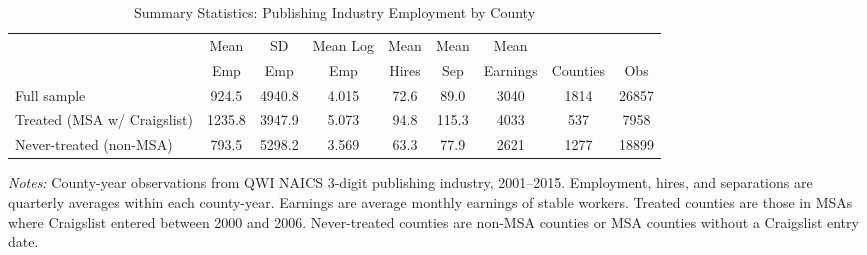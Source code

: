 \begin{table}[htbp]
\centering
\caption{Summary Statistics: Publishing Industry Employment by County}
\label{tab:sumstats}
\begin{adjustbox}{max width=\textwidth}
\begin{threeparttable}
\begin{tabular}{lcccccccc}
\toprule
 & Mean & SD & Mean Log & Mean & Mean & Mean & & \\
 & Emp & Emp & Emp & Hires & Sep & Earnings & Counties & Obs \\
\midrule
Full sample & 924.5 & 4940.8 & 4.015 & 72.6 & 89.0 & 3040 & 1814 & 26857 \\
Treated (MSA w/ Craigslist) & 1235.8 & 3947.9 & 5.073 & 94.8 & 115.3 & 4033 & 537 & 7958 \\
Never-treated (non-MSA) & 793.5 & 5298.2 & 3.569 & 63.3 & 77.9 & 2621 & 1277 & 18899 \\
\bottomrule
\end{tabular}
\begin{tablenotes}[flushleft]
\footnotesize\raggedright
\item \textit{Notes:} County-year observations from QWI NAICS 3-digit publishing industry, 2001--2015. Employment, hires, and separations are quarterly averages within each county-year. Earnings are average monthly earnings of stable workers. Treated counties are those in MSAs where Craigslist entered between 2000 and 2006. Never-treated counties are non-MSA counties or MSA counties without a Craigslist entry date.
\end{tablenotes}
\end{threeparttable}
\end{adjustbox}
\end{table}

